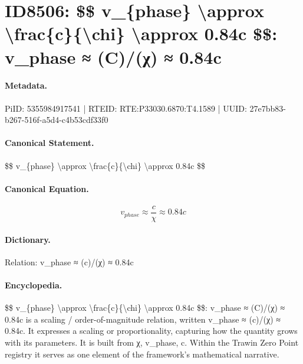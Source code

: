 \section*{ID8506: \$\$ v\_\{phase\} \textbackslash{}approx \textbackslash{}frac\{c\}\{\textbackslash{}chi\} \textbackslash{}approx 0.84c \$\$: v\_phase ≈ (C)/(χ) ≈ 0.84c}
\paragraph{Metadata.}
PiID: 5355984917541 | RTEID: RTE:P33030.6870:T4.1589 | UUID: 27e7bb83-b267-516f-a5d4-c4b53cdf33f0

\paragraph{Canonical Statement.}
\$\$ v\_\{phase\} \textbackslash{}approx \textbackslash{}frac\{c\}\{\textbackslash{}chi\} \textbackslash{}approx 0.84c \$\$

\paragraph{Canonical Equation.}
\[
v_{phase} \approx \frac{c}{\chi} \approx 0.84c
\]

\paragraph{Dictionary.}
Relation: v\_phase ≈ (c)/(χ) ≈ 0.84c

\paragraph{Encyclopedia.}
\$\$ v\_\{phase\} \textbackslash{}approx \textbackslash{}frac\{c\}\{\textbackslash{}chi\} \textbackslash{}approx 0.84c \$\$: v\_phase ≈ (C)/(χ) ≈ 0.84c is a scaling / order-of-magnitude relation, written v\_phase ≈ (c)/(χ) ≈ 0.84c. It expresses a scaling or proportionality, capturing how the quantity grows with its parameters. It is built from χ, v\_phase, c. Within the Trawin Zero Point registry it serves as one element of the framework's mathematical narrative.
